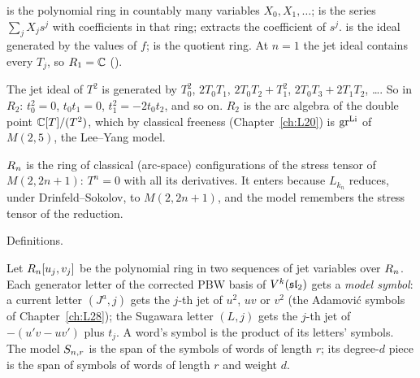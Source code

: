 \begin{dictionary}
 is the polynomial ring in countably many variables $X_0,X_1,\dots$; 
is the series $\sum_jX_js^j$ with coefficients in that ring;  extracts the coefficient of
$s^j$.  is the ideal generated by the values of $f$;  is the quotient ring.
At $n=1$ the jet ideal contains every $T_j$, so $R_1={\mathbb{C}}$ ().
\end{dictionary}

\begin{example}[$n=2$]
The jet ideal of $T^2$ is generated by $T_0^2$, $2T_0T_1$, $2T_0T_2+T_1^2$, $2T_0T_3+2T_1T_2$, \dots. So in $R_2$:
$t_0^2=0$, $t_0t_1=0$, $t_1^2=-2t_0t_2$, and so on. $R_2$ is the arc algebra of the double point ${\mathbb{C}}[T]/(T^2)$, which by
classical freeness (Chapter~\ref{ch:L20}) is $\operatorname{gr}^{\mathrm{Li}}$ of $M(2,5)$, the Lee--Yang model.
\end{example}

\begin{physics}
$R_n$ is the ring of classical (arc-space) configurations of the stress tensor of $M(2,2n+1)$: $T^n=0$ with
all its derivatives. It enters because $L_{k_n}$ reduces, under Drinfeld--Sokolov, to $M(2,2n+1)$, and the model
remembers the stress tensor of the reduction.
\end{physics}

\begin{status}
Definitions.
\end{status}

\begin{definition}\label{l29:def:model}
Let $R_n[u_j,v_j]$ be the polynomial ring in two sequences of jet variables over $R_n$. Each
generator letter of the corrected PBW basis of $V^k(\mathfrak{sl}_2)$ gets a \emph{model symbol}: a current letter
$(J^a,j)$ gets the $j$-th jet of $u^2$, $uv$ or $v^2$ (the Adamovi\'c symbols of Chapter~\ref{ch:L28}); the Sugawara
letter $(L,j)$ gets the $j$-th jet of $-(u'v-uv')$ plus $t_j$. A word's symbol is the product of its letters' symbols.
The model $S_{n,r}$ is the span of the symbols of words of length $r$; its degree-$d$ piece is the span of symbols
of words of length $r$ and weight $d$.
\end{definition}

